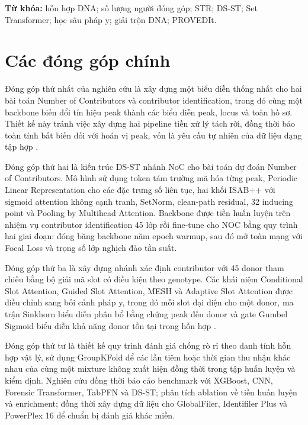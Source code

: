 \documentclass[12pt,a4paper]{article}
\begin{document}
\medskip
\noindent\textbf{Từ khóa:} hỗn hợp DNA; số lượng người đóng góp; STR; DS-ST; Set Transformer; học sâu pháp y; giải trộn DNA; PROVEDIt.

\section*{Các đóng góp chính}

Đóng góp thứ nhất của nghiên cứu là xây dựng một biểu diễn thống nhất cho hai bài toán Number of Contributors và contributor identification, trong đó cùng một backbone biến đổi tín hiệu peak thành các biểu diễn peak, locus và toàn hồ sơ. Thiết kế này tránh việc xây dựng hai pipeline tiền xử lý tách rời, đồng thời bảo toàn tính bất biến đối với hoán vị peak, vốn là yêu cầu tự nhiên của dữ liệu dạng tập hợp \cite{zaheer2017,lee2019}.

Đóng góp thứ hai là kiến trúc DS-ST nhánh NoC cho bài toán dự đoán Number of Contributors. Mô hình sử dụng token tám trường mã hóa từng peak, Periodic Linear Representation \cite{gorishniy2022} cho các đặc trưng số liên tục, hai khối ISAB++ với sigmoid attention không cạnh tranh, SetNorm, clean-path residual, 32 inducing point và Pooling by Multihead Attention. Backbone được tiền huấn luyện trên nhiệm vụ contributor identification 45 lớp rồi fine-tune cho NOC bằng quy trình hai giai đoạn: đóng băng backbone năm epoch warmup, sau đó mở toàn mạng với Focal Loss và trọng số lớp nghịch đảo tần suất.

Đóng góp thứ ba là xây dựng nhánh xác định contributor với 45 donor tham chiếu bằng bộ giải mã slot có điều kiện theo genotype. Các khái niệm Conditional Slot Attention, Guided Slot Attention, MESH và Adaptive Slot Attention được điều chỉnh sang bối cảnh pháp y, trong đó mỗi slot đại diện cho một donor, ma trận Sinkhorn biểu diễn phân bổ bằng chứng peak đến donor và gate Gumbel Sigmoid biểu diễn khả năng donor tồn tại trong hỗn hợp \cite{ma2024cosa,lee2024gsa,zhang2023mesh,fan2024adaslot}.

Đóng góp thứ tư là thiết kế quy trình đánh giá chống rò rỉ theo danh tính hỗn hợp vật lý, sử dụng GroupKFold để các lần tiêm hoặc thời gian thu nhận khác nhau của cùng một mixture không xuất hiện đồng thời trong tập huấn luyện và kiểm định. Nghiên cứu đồng thời báo cáo benchmark với XGBoost, CNN, Forensic Transformer, TabPFN và DS-ST; phân tích ablation về tiền huấn luyện và enrichment; đồng thời xây dựng dữ liệu cho GlobalFiler, Identifiler Plus và PowerPlex 16 để chuẩn bị đánh giá khác miền.
\end{document}
